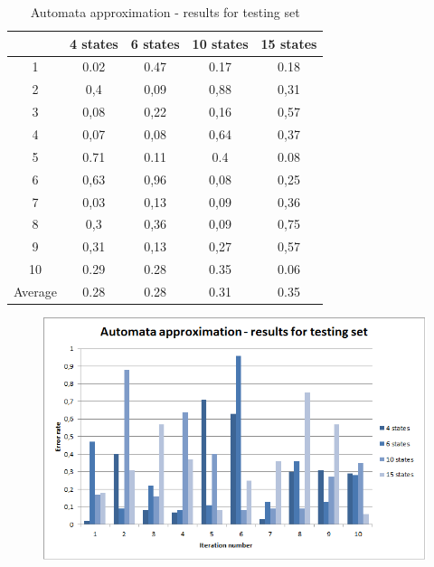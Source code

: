 \documentclass[runningheads,a4paper]{llncs}
\begin{document}
\begin{table}[]
\centering
\caption{Automata approximation - results for testing set}
\label{my-label}
\begin{tabular}{@{}ccccc@{}}
\toprule
        & 4 states & 6 states & 10 states & 15 states \\ \midrule
1       & 0.02     & 0.47     & 0.17      & 0.18      \\
2       & 0,4      & 0,09     & 0,88      & 0,31      \\
3       & 0,08     & 0,22     & 0,16      & 0,57      \\
4       & 0,07     & 0,08     & 0,64      & 0,37      \\
5       & 0.71     & 0.11     & 0.4       & 0.08      \\
6       & 0,63     & 0,96     & 0,08      & 0,25        \\
7       & 0,03     & 0,13     & 0,09      & 0,36        \\
8       & 0,3      & 0,36     & 0,09      & 0,75         \\
9       & 0,31     & 0,13     & 0,27      & 0,57     \\
10      & 0.29     & 0.28     & 0.35      & 0.06      \\
Average & 0.28    & 0.28    & 0.31     & 0.35      \\ \bottomrule
\end{tabular}
\end{table}

\begin{figure}
\centering
\includegraphics[scale=1]{1.png}
\end{figure}
\end{document}

